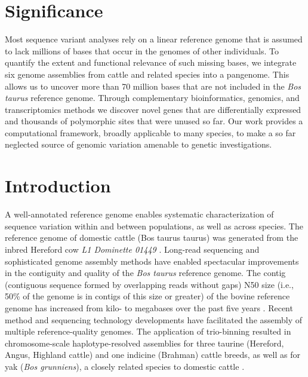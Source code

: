 \documentclass[../main.tex]{subfiles}
\begin{document}
\newpage

\section*{Significance}
\doublespacing
Most sequence variant analyses rely on a linear reference genome that is assumed to lack millions of bases that occur in the genomes of other individuals. To quantify the extent and functional relevance of such missing bases, we integrate six genome assemblies from cattle and related species into a pangenome. This allows us to uncover more than 70 million bases that are not included in the \emph{Bos taurus} reference genome. Through complementary bioinformatics, genomics, and transcriptomics methods we discover novel genes that are differentially expressed and thousands of polymorphic sites that were unused so far. Our work provides a computational framework, broadly applicable to many species, to make a so far neglected source of genomic variation amenable to genetic investigations.

\section{Introduction}
 
\normalsize

A well-annotated reference genome enables systematic characterization of sequence variation within and between populations, as well as across species. The reference genome of domestic cattle (Bos taurus taurus) was generated from the inbred Hereford cow \emph{L1 Dominette 01449} \citep{sequencing2009genome}. Long-read sequencing and sophisticated genome assembly methods have enabled spectacular improvements in the contiguity and quality of the \emph{Bos taurus} reference genome. The contig (contiguous sequence formed by overlapping reads without gaps) N50 size (i.e., 50\% of the genome is in contigs of this size or greater) of the bovine reference genome has increased from kilo- to megabases over the past five years \citep{rosen2020novo}. Recent method and sequencing technology developments have facilitated the assembly of multiple reference-quality genomes. The application of trio-binning \citep{koren2018novo} resulted in chromosome-scale haplotype-resolved assemblies for three taurine (Hereford, Angus, Highland cattle) and one indicine (Brahman) cattle breeds, as well as for yak (\emph{Bos grunniens}), a closely related species to domestic cattle \citep{low2020haplotype,rice2020continuous}.
\end{document}
